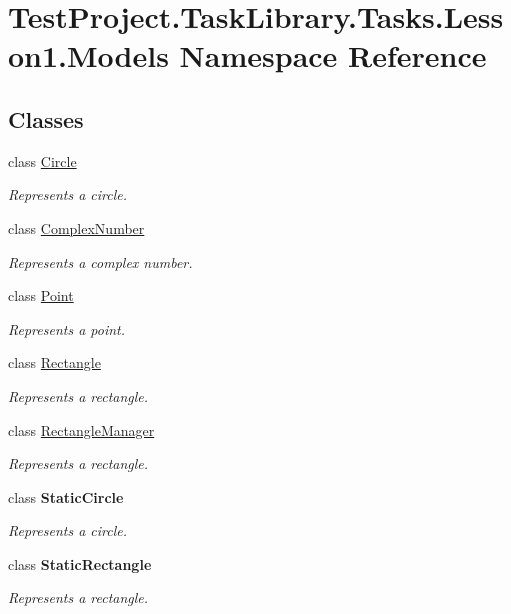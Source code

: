 \hypertarget{namespace_test_project_1_1_task_library_1_1_tasks_1_1_lesson1_1_1_models}{}\section{Test\+Project.\+Task\+Library.\+Tasks.\+Lesson1.\+Models Namespace Reference}
\label{namespace_test_project_1_1_task_library_1_1_tasks_1_1_lesson1_1_1_models}
\subsection*{Classes}
\begin{DoxyCompactItemize}
\item 
class \mbox{\hyperlink{class_test_project_1_1_task_library_1_1_tasks_1_1_lesson1_1_1_models_1_1_circle}{Circle}}
\begin{DoxyCompactList}\small\item\em Represents a circle. \end{DoxyCompactList}\item 
class \mbox{\hyperlink{class_test_project_1_1_task_library_1_1_tasks_1_1_lesson1_1_1_models_1_1_complex_number}{Complex\+Number}}
\begin{DoxyCompactList}\small\item\em Represents a complex number. \end{DoxyCompactList}\item 
class \mbox{\hyperlink{class_test_project_1_1_task_library_1_1_tasks_1_1_lesson1_1_1_models_1_1_point}{Point}}
\begin{DoxyCompactList}\small\item\em Represents a point. \end{DoxyCompactList}\item 
class \mbox{\hyperlink{class_test_project_1_1_task_library_1_1_tasks_1_1_lesson1_1_1_models_1_1_rectangle}{Rectangle}}
\begin{DoxyCompactList}\small\item\em Represents a rectangle. \end{DoxyCompactList}\item 
class \mbox{\hyperlink{class_test_project_1_1_task_library_1_1_tasks_1_1_lesson1_1_1_models_1_1_rectangle_manager}{Rectangle\+Manager}}
\begin{DoxyCompactList}\small\item\em Represents a rectangle. \end{DoxyCompactList}\item 
class {\bfseries Static\+Circle}
\begin{DoxyCompactList}\small\item\em Represents a circle. \end{DoxyCompactList}\item 
class {\bfseries Static\+Rectangle}
\begin{DoxyCompactList}\small\item\em Represents a rectangle. \end{DoxyCompactList}\end{DoxyCompactItemize}
